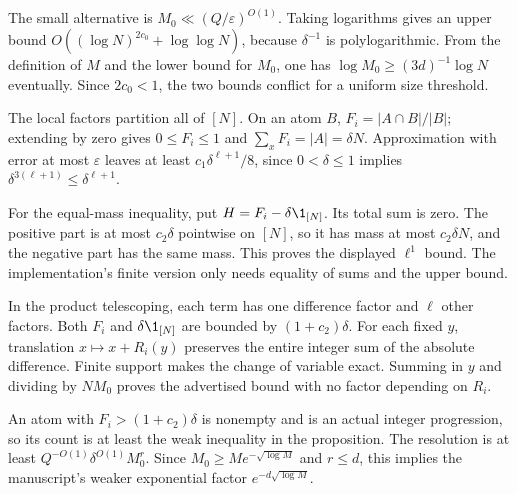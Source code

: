 The small alternative is $M_0\ll(Q/\varepsilon)^{O(1)}$. Taking logarithms gives an upper bound $O((\log N)^{2c_0}+\log\log N)$, because $\delta^{-1}$ is polylogarithmic. From the definition of $M$ and the lower bound for $M_0$, one has $\log M_0\geq(3d)^{-1}\log N$ eventually. Since $2c_0<1$, the two bounds conflict for a uniform size threshold.

The local factors partition all of $[N]$. On an atom $B$, $F_i=|A\cap B|/|B|$; extending by zero gives $0\leq F_i\leq1$ and $\sum_xF_i=|A|=\delta N$. Approximation with error at most $\varepsilon$ leaves at least $c_1\delta^{\ell+1}/8$, since $0<\delta\leq1$ implies $\delta^{3(\ell+1)}\leq\delta^{\ell+1}$.

For the equal-mass inequality, put $H=F_i-\delta\1_{[N]}$. Its total sum is zero. The positive part is at most $c_2\delta$ pointwise on $[N]$, so it has mass at most $c_2\delta N$, and the negative part has the same mass. This proves the displayed $\ell^1$ bound. The implementation's finite version only needs equality of sums and the upper bound.

In the product telescoping, each term has one difference factor and $\ell$ other factors. Both $F_i$ and $\delta\1_{[N]}$ are bounded by $(1+c_2)\delta$. For each fixed $y$, translation $x\mapsto x+R_i(y)$ preserves the entire integer sum of the absolute difference. Finite support makes the change of variable exact. Summing in $y$ and dividing by $NM_0$ proves the advertised bound with no factor depending on $R_i$.

An atom with $F_i>(1+c_2)\delta$ is nonempty and is an actual integer progression, so its count is at least the weak inequality in the proposition. The resolution is at least $Q^{-O(1)}\delta^{O(1)}M_0^r$. Since $M_0\geq M e^{-\sqrt{\log M}}$ and $r\leq d$, this implies the manuscript's weaker exponential factor $e^{-d\sqrt{\log M}}$.
\fi

